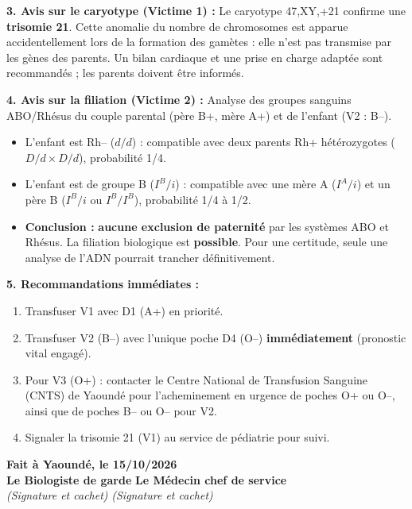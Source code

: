 \documentclass[11pt]{article}
\begin{document}
\begin{exoresolu}
\noindent \textbf{3. Avis sur le caryotype (Victime 1) :}
Le caryotype 47,XY,+21 confirme une \textbf{trisomie 21}. Cette anomalie du nombre de chromosomes est apparue accidentellement lors de la formation des gamètes : elle n'est pas transmise par les gènes des parents. Un bilan cardiaque et une prise en charge adaptée sont recommandés ; les parents doivent être informés.

\noindent \textbf{4. Avis sur la filiation (Victime 2) :}
Analyse des groupes sanguins ABO/Rhésus du couple parental (père B+, mère A+) et de l'enfant (V2 : B–).
\begin{itemize}
    \item L'enfant est Rh– ($d/d$) : compatible avec deux parents Rh+ hétérozygotes ($D/d \times D/d$), probabilité 1/4.
    \item L'enfant est de groupe B ($I^B/i$) : compatible avec une mère A ($I^A/i$) et un père B ($I^B/i$ ou $I^B/I^B$), probabilité 1/4 à 1/2.
    \item \textbf{Conclusion :} \textbf{aucune exclusion de paternité} par les systèmes ABO et Rhésus. La filiation biologique est \textbf{possible}. Pour une certitude, seule une analyse de l'ADN pourrait trancher définitivement.
\end{itemize}

\noindent \textbf{5. Recommandations immédiates :}
\begin{enumerate}
    \item Transfuser V1 avec D1 (A+) en priorité.
    \item Transfuser V2 (B–) avec l'unique poche D4 (O–) \textbf{immédiatement} (pronostic vital engagé).
    \item Pour V3 (O+) : contacter le Centre National de Transfusion Sanguine (CNTS) de Yaoundé pour l'acheminement en urgence de poches O+ ou O–, ainsi que de poches B– ou O– pour V2.
    \item Signaler la trisomie 21 (V1) au service de pédiatrie pour suivi.
\end{enumerate}

\vspace{0.8cm}
\noindent \textbf{Fait à Yaoundé, le 15/10/2026} \\
\noindent \textbf{Le Biologiste de garde} \hfill \textbf{Le Médecin chef de service} \\
\noindent \emph{(Signature et cachet)} \hfill \emph{(Signature et cachet)}
\end{exoresolu}
\end{document}

